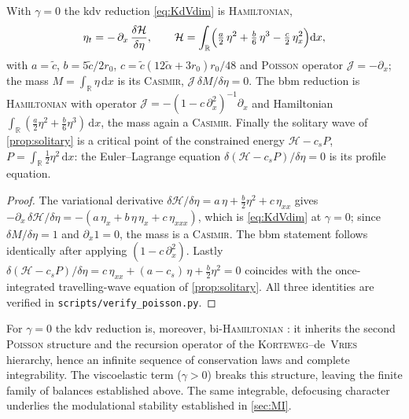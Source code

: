\documentclass[alpha-refs, 12pt]{wiley-article}
\newcommand{\ud}{\mathrm{d}}
\begin{document}
\begin{proposition}\label{prop:poisson}
With $\gamma=0$ the \acrshort{kdv} reduction \eqref{eq:KdVdim} is \textsc{Hamiltonian},
\begin{equation}\label{eq:kdv_hamiltonian}
  \eta_{t}=-\,\partial_{x}\,\frac{\delta\mathcal{H}}{\delta\eta},\qquad
  \mathcal{H}=\int_{\mathbb{R}}\Bigl(\tfrac{a}{2}\,\eta^{2}+\tfrac{b}{6}\,\eta^{3}-\tfrac{c}{2}\,\eta_{x}^{2}\Bigr)\ud x,
\end{equation}
with $a=\tilde{c}$, $b=5\tilde{c}/2r_{0}$, $c=\tilde{c}(12\tilde{\alpha}+3r_{0})r_{0}/48$ and \textsc{Poisson} operator $\mathcal{J}=-\partial_{x}$; the mass $M=\int_{\mathbb{R}}\eta\,\ud x$ is its \textsc{Casimir}, $\mathcal{J}\,\delta M/\delta\eta=0$. The \acrshort{bbm} reduction is \textsc{Hamiltonian} with operator $\mathcal{J}=-(1-c\,\partial_{x}^{2})^{-1}\partial_{x}$ and Hamiltonian $\int_{\mathbb{R}}(\tfrac{a}{2}\eta^{2}+\tfrac{b}{6}\eta^{3})\,\ud x$, the mass again a \textsc{Casimir}. Finally the solitary wave of \cref{prop:solitary} is a critical point of the constrained energy $\mathcal{H}-c_{s}P$, $P=\int_{\mathbb{R}}\tfrac12\eta^{2}\,\ud x$: the Euler--Lagrange equation $\delta(\mathcal{H}-c_{s}P)/\delta\eta=0$ is its profile equation.
\end{proposition}
\begin{proof}
The variational derivative $\delta\mathcal{H}/\delta\eta=a\,\eta+\tfrac{b}{2}\eta^{2}+c\,\eta_{xx}$ gives $-\partial_{x}\,\delta\mathcal{H}/\delta\eta=-(a\,\eta_{x}+b\,\eta\,\eta_{x}+c\,\eta_{xxx})$, which is \eqref{eq:KdVdim} at $\gamma=0$; since $\delta M/\delta\eta=1$ and $\partial_{x}1=0$, the mass is a \textsc{Casimir}. The \acrshort{bbm} statement follows identically after applying $(1-c\,\partial_{x}^{2})$. Lastly $\delta(\mathcal{H}-c_{s}P)/\delta\eta=c\,\eta_{xx}+(a-c_{s})\,\eta+\tfrac{b}{2}\eta^{2}=0$ coincides with the once-integrated travelling-wave equation of \cref{prop:solitary}. All three identities are verified in \texttt{scripts/verify\_poisson.py}.
\end{proof}

\begin{remark}\label{rem:biham}
For $\gamma=0$ the \acrshort{kdv} reduction is, moreover, bi-\textsc{Hamiltonian} \citep{Magri1978}: it inherits the second \textsc{Poisson} structure and the recursion operator of the \textsc{Korteweg}--de~\textsc{Vries} hierarchy, hence an infinite sequence of conservation laws and complete integrability. The viscoelastic term ($\gamma>0$) breaks this structure, leaving the finite family of balances established above. The same integrable, defocusing character underlies the modulational stability established in \cref{sec:MI}.
\end{remark}
\end{document}
